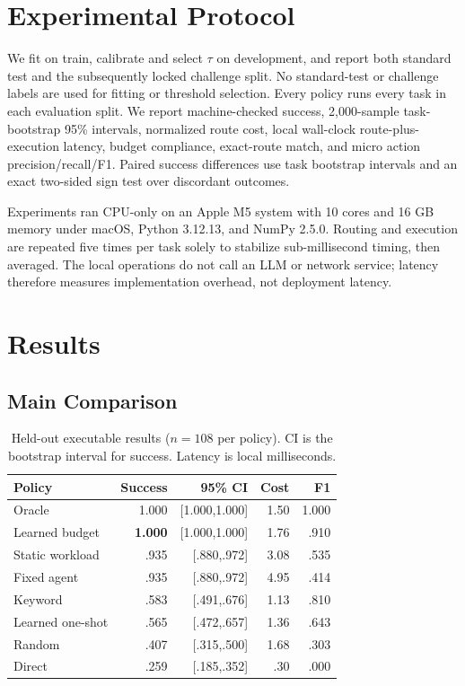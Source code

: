 \documentclass[letterpaper]{article} %
\begin{document}
\section{Experimental Protocol}

We fit on train, calibrate and select $\tau$ on development, and report both standard test and the subsequently locked challenge split. No standard-test or challenge labels are used for fitting or threshold selection. Every policy runs every task in each evaluation split. We report machine-checked success, 2,000-sample task-bootstrap 95\% intervals, normalized route cost, local wall-clock route-plus-execution latency, budget compliance, exact-route match, and micro action precision/recall/F1. Paired success differences use task bootstrap intervals and an exact two-sided sign test over discordant outcomes.

Experiments ran CPU-only on an Apple M5 system with 10 cores and 16 GB memory under macOS, Python 3.12.13, and NumPy 2.5.0. Routing and execution are repeated five times per task solely to stabilize sub-millisecond timing, then averaged. The local operations do not call an LLM or network service; latency therefore measures implementation overhead, not deployment latency.

\section{Results}

\subsection{Main Comparison}

\begin{table}[t]
\centering
\small
\caption{Held-out executable results ($n=108$ per policy). CI is the bootstrap interval for success. Latency is local milliseconds.}
\label{tab:main}
\begin{tabular}{lrrrr}
\toprule
Policy & Success & 95\% CI & Cost & F1 \\
\midrule
Oracle & 1.000 & [1.000,1.000] & 1.50 & 1.000 \\
Learned budget & \textbf{1.000} & [1.000,1.000] & 1.76 & .910 \\
Static workload & .935 & [.880,.972] & 3.08 & .535 \\
Fixed agent & .935 & [.880,.972] & 4.95 & .414 \\
Keyword & .583 & [.491,.676] & 1.13 & .810 \\
Learned one-shot & .565 & [.472,.657] & 1.36 & .643 \\
Random & .407 & [.315,.500] & 1.68 & .303 \\
Direct & .259 & [.185,.352] & .30 & .000 \\
\bottomrule
\end{tabular}
\end{table}
\end{document}
